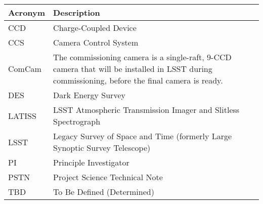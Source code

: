 \addtocounter{table}{-1}
\begin{longtable}{p{}p{}}\hline
\textbf{Acronym} & \textbf{Description}  \\\hline

CCD & Charge-Coupled Device \\\hline
CCS & Camera Control System \\\hline
ComCam & The commissioning camera is a single-raft, 9-CCD camera that will be installed in LSST during commissioning, before the final camera is ready. \\\hline
DES & Dark Energy Survey \\\hline
LATISS & LSST Atmospheric Transmission Imager and Slitless Spectrograph \\\hline
LSST & Legacy Survey of Space and Time (formerly Large Synoptic Survey Telescope) \\\hline
PI & Principle Investigator \\\hline
PSTN & Project Science Technical Note \\\hline
TBD & To Be Defined (Determined) \\\hline
\end{longtable}
